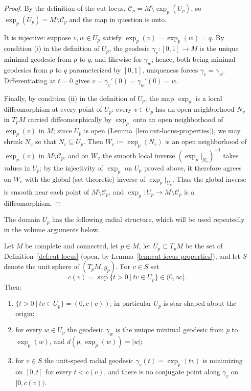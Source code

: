 \begin{proof}
By the definition of the cut locus, ${\mathcal C}_p=M\setminus
\exp_p(U_p)$, so $\exp_p(U_p)=M\setminus{\mathcal C}_p$ and
the map in question is onto.

It is injective: suppose $v,w\in U_p$ satisfy
$\exp_p(v)=\exp_p(w)=q$. By condition (i) in the
definition of $U_p$, the geodesic $\gamma_v\colon[0,1]\to M$ is the
unique minimal geodesic from $p$ to $q$, and likewise for
$\gamma_w$; hence, both being minimal geodesics from $p$ to $q$
parameterized by $[0,1]$, uniqueness forces $\gamma_v=\gamma_w$.
Differentiating at $t=0$ gives $v=\gamma_v'(0)=\gamma_w'(0)=w$.

Finally, by condition (ii) in the definition of $U_p$, the map
$\exp_p$ is a local diffeomorphism at every point of $U_p$: every
$v\in U_p$ has an open neighborhood $N_v$ in $T_pM$ carried
diffeomorphically by $\exp_p$ onto an open neighborhood of
$\exp_p(v)$ in $M$; since $U_p$ is open
(Lemma~\ref{lem:cut-locus-properties}), we may shrink $N_v$ so
that $N_v\subseteq U_p$. Then $W_v:=\exp_p(N_v)$ is an open
neighborhood of $\exp_p(v)$ in $M\setminus{\mathcal C}_p$, and on
$W_v$ the smooth local inverse $(\exp_p|_{N_v})^{-1}$ takes
values in $U_p$; by the injectivity of $\exp_p$ on $U_p$ proved
above, it therefore agrees on $W_v$ with the global
(set-theoretic) inverse of $\exp_p|_{U_p}$. Thus the global
inverse is smooth near each point of $M\setminus{\mathcal C}_p$,
and $\exp_p\colon U_p\to
M\setminus{\mathcal C}_p$ is a diffeomorphism.
\end{proof}

The domain $U_p$ has the following radial structure, which will be
used repeatedly in the volume arguments below.

\begin{lemma}
\label{lem:cut-time-star-shaped}
Let $M$ be complete and connected, let $p\in M$, let
$U_p\subset T_pM$ be the
set of Definition~\ref{def:cut-locus} (open, by
Lemma~\ref{lem:cut-locus-properties}), and let $S$ denote the
unit sphere of $(T_pM,g_p)$. For $v\in S$ set
$$c(v)=\sup\{t>0\ |\ tv\in U_p\}\in(0,\infty].$$
Then:
\begin{enumerate}
\item $\{t>0\ |\ tv\in U_p\}=(0,c(v))$; in particular $U_p$ is
star-shaped about the origin;
\item for every $w\in U_p$ the geodesic $\gamma_w$ is the unique
minimal geodesic from $p$ to $\exp_p(w)$, and
$d(p,\exp_p(w))=|w|$;
\item for $v\in S$ the unit-speed radial geodesic
$\gamma_v(t)=\exp_p(tv)$ is minimizing on $[0,t]$ for every
$t<c(v)$, and there is no conjugate point along $\gamma_v$ on
$[0,c(v))$.
\end{enumerate}
\end{lemma}

